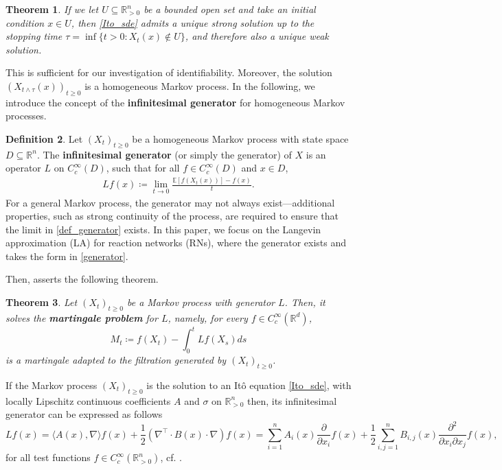 \documentclass[10pt,a4paper]{amsart}
\newtheorem{theorem}{Theorem}[section]
\theoremstyle{definition}
\newtheorem{definition}[theorem]{Definition}
\theoremstyle{remark}
\theoremstyle{consequence}
\def\E{\mathbb{E}}
\def\R{\mathbb{R}}
\numberwithin{equation}{section}
\begin{document}
{\begin{theorem}\label{uniqueness}
    If we let $U \subseteq \R_{>0}^n$ be a bounded open set and take an initial condition $x \in U$, then \eqref{Ito_sde} admits a unique strong solution up to the stopping time $\tau = \inf\{t > 0\colon X_t (x) \notin U\}$, and therefore also a unique weak solution.
\end{theorem}}
This is sufficient for our investigation of identifiability.
Moreover, the solution $(X_{t\wedge \tau}(x))_{t \geq 0}$ is a homogeneous Markov process. In the following, we introduce the concept of the \textbf{infinitesimal generator} for homogeneous Markov processes.
 \begin{definition}\cite[Definition 7.3.1]{oksendal2013stochastic} \label{def_generator-0}
Let $(X_t)_{t \geq 0}$ be a homogeneous Markov process with state space $D \subseteq \R^n$. The \textbf{infinitesimal generator} (or simply the generator) of $X$ is an operator $L$ on $C_c^{\infty} (D)$, such that for all $f \in C_c^{\infty} (D)$ and $x \in D$,
\begin{align}\label{def_generator}
  L f(x) \coloneqq \lim_{t \to 0} \frac{\E[f(X_t(x))] - f(x)}{t}.
\end{align}
For a general Markov process, the generator may not always exist—additional properties, such as strong continuity of the process, are required to ensure that the limit in \eqref{def_generator} exists. In this paper, we focus on the Langevin approximation (LA) for reaction networks (RNs), where the generator exists and takes the form in \eqref{generator}.
\end{definition}





Then, \cite[Proposition 1.7 in Chapter 4]{ethier1986markov} asserts the following theorem.
\begin{theorem}
  Let $(X_t)_{t \geq 0}$ be a Markov process with generator $L$. Then, it solves the \textbf{martingale problem} for $L$, namely, for every $f \in C_c^{\infty} (\R^d)$,
  \[
    M_t \coloneqq f(X_t) - \int_0^t L f(X_s) ds
  \]
  is a martingale adapted to the filtration generated by $(X_t)_{t \geq 0}$.
\end{theorem}

If the Markov process $(X_t)_{t \geq 0}$ is the solution to an It\^{o} equation \eqref{Ito_sde}, with locally Lipschitz continuous coefficients $A$ and $\sigma$ on $\R_{> 0}^n$ then, its infinitesimal generator can be expressed as follows
\begin{equation}\label{generator}
    Lf(x) = \langle A(x), \nabla \rangle f{(x)}+{\frac{1}{2}} (\nabla^{\intercal} \cdot B (x) \cdot \nabla) f{(x)} = \sum_{i = 1}^n A_i(x)\frac{\partial}{\partial x_i}f(x)+\frac{1}{2}\sum_{i,j = 1}^n B_{i,j}(x)\frac{\partial^2}{\partial x_i\partial x_j}f(x),
\end{equation}
for all test functions $f\in C^{\infty}_c(\R_{> 0}^n)$, cf. \cite[Theorem 7.3.3]{oksendal2013stochastic}. 
\end{document}
